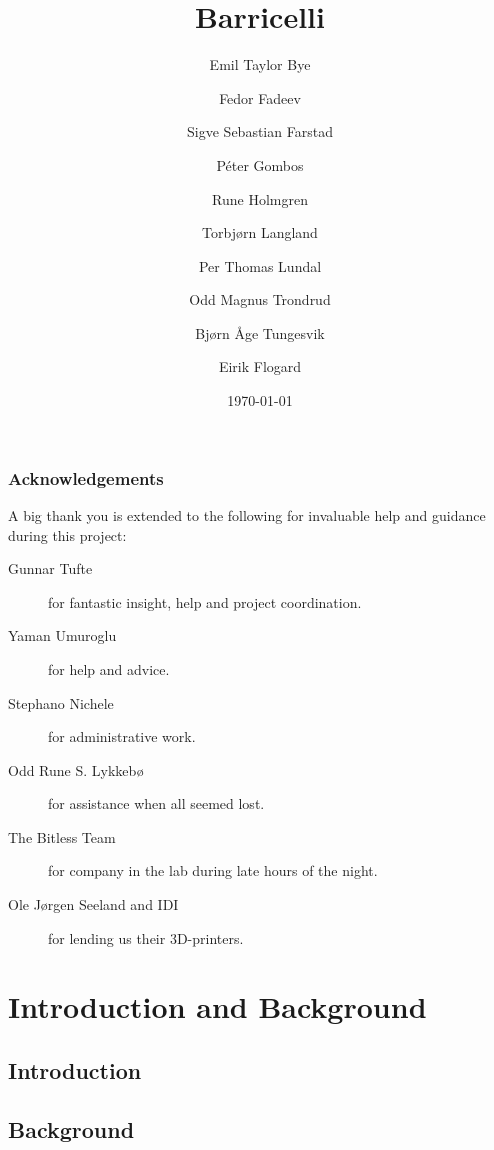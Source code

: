 \documentclass[a4paper]{report}
\title{Barricelli}
\date{\today}
\author{Emil Taylor Bye
     \and Fedor Fadeev
     \and Sigve Sebastian Farstad
     \and Péter Gombos
     \and Rune Holmgren
     \and Torbjørn Langland
     \and Per Thomas Lundal
     \and Odd Magnus Trondrud
     \and Bjørn Åge Tungesvik
     \and Eirik Flogard
}
\begin{document}



\newpage
\thispagestyle{empty}
\mbox{}
\newpage

\begin{abstract}
	
\end{abstract}

\thispagestyle{empty}
\section*{Acknowledgements}
A big thank you is extended to the following for invaluable help and guidance during this project:

\begin{description}
\item[Gunnar Tufte] for fantastic insight, help and project coordination.
\item[Yaman Umuroglu] for help and advice.
\item[Stephano Nichele] for administrative work.
\item[Odd Rune S. Lykkebø] for assistance when all seemed lost.
\item[The Bitless Team] for company in the lab during late hours of the night.
\item[Ole Jørgen Seeland and IDI] for lending us their 3D-printers.
\end{description}

\setcounter{page}{3}

\tableofcontents
\newpage

\listoffigures
\listoftables
\listofalgorithms
\renewcommand{\lstlistlistingname}{List of Listings}
\lstlistoflistings

\newpage
\setcounter{page}{1}

\part{Introduction and Background}

\chapter{Introduction}
	

\chapter{Background}
	
\end{document}
